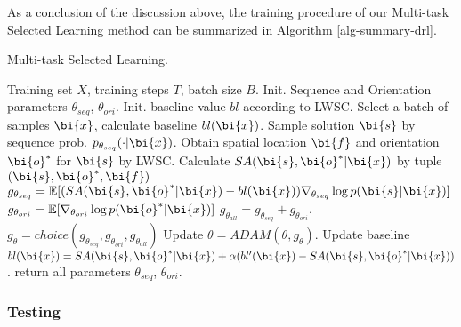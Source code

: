 As a conclusion of the discussion above, the training procedure of our Multi-task Selected Learning method can be summarized in Algorithm \ref{alg-summary-drl}.

\begin{algorithm}                  %
	\caption{Multi-task Selected Learning.}       
	\label{alg-summary-drl} 
	\begin{algorithmic}[1]
		\State Training set $X$, training steps $T$, batch size $B$.
		\State Init. Sequence and Orientation parameters $\theta_{seq}$, $\theta_{ori}$.
		\State Init. baseline value $bl$ according to LWSC.
		\State Select a batch of samples $\bi{x}$, calculate baseline $bl(\bi{x})$.
		\State Sample solution $\bi{s}$ by sequence prob. $p_{\theta_{seq}}(\cdot|\bi{x})$.
		\State Obtain spatial location $\bi{f}$ and orientation $\bi{o}^{*}$ for $\bi{s}$ by LWSC.
		\State Calculate $SA(\bi{s},\bi{o}^{*}|\bi{x})$ by tuple $(\bi{s},\bi{o}^{*},\bi{f})$
		\State %
		$g_{\theta_{seq}}=\mathbb{E}[(SA(\bi{s}, \bi{o}^{*}|\bi{x})-bl(\bi{x}))\nabla_{\theta_{seq}}\log{p(\bi{s}|\bi{x})}]$
		\State  %
		$g_{\theta_{ori}}=\mathbb{E}[\nabla_{\theta_{ori}}\log{p(\bi{o}^{*}|\bi{x})}]$
		\State 	$g_{\theta_{all}}= g_{\theta_{seq}}+g_{\theta_{ori}}$.
		\State  $g_{\theta} = choice(g_{\theta_{seq}},g_{\theta_{ori}},g_{\theta_{all}})$
		\State Update $\theta = ADAM(\theta, g_{\theta})$.
		\State Update baseline $bl(\bi{x}) = SA(\bi{s},\bi{o}^{*}|\bi{x}) + \alpha(bl'(\bi{x})-SA(\bi{s},\bi{o}^{*}|\bi{x}))$.
		\EndFor
		\State return all parameters $\theta_{seq}$, $\theta_{ori}$.
	\end{algorithmic}

\end{algorithm}


\subsubsection{Testing}
\label{sec:test}


